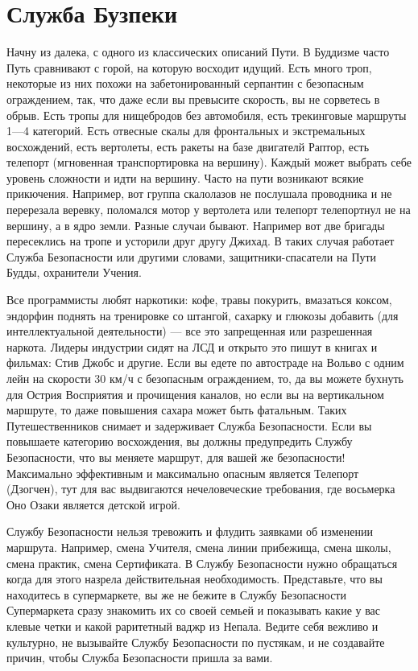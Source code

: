 \section{Служба Бузпеки}

Начну из далека, с одного из классических описаний Пути. В Буддизме часто Путь сравнивают с горой, на которую восходит идущий. Есть много троп, некоторые из них похожи на забетонированный серпантин с безопасным ограждением, так, что даже если вы превысите скорость, вы не сорветесь в обрыв. Есть тропы для нищебродов без автомобиля, есть трекинговые маршруты 1—4 категорий. Есть отвесные скалы для фронтальных и экстремальных восхождений, есть вертолеты, есть ракеты на базе двигателй Раптор, есть телепорт (мгновенная транспортировка на вершину). Каждый может выбрать себе уровень сложности и идти на вершину. Часто на пути возникают всякие прикючения. Например, вот группа скалолазов не послушала проводника и не перерезала веревку, поломался мотор у вертолета или телепорт телепортнул не на вершину, а в ядро земли. Разные случаи бывают. Например вот две бригады пересеклись на тропе и усторили друг другу Джихад. В таких случая работает Служба Безопасности или другими словами, защитники-спасатели на Пути Будды, охранители Учения.

Все программисты любят наркотики: кофе, травы покурить, вмазаться коксом, эндорфин поднять на тренировке со штангой, сахарку и глюкозы добавить (для интеллектуальной деятельности) — все это запрещенная или разрешенная наркота. Лидеры индустрии сидят на ЛСД и открыто это пишут в книгах и фильмах: Стив Джобс и другие. Если вы едете по автостраде на Вольво с одним лейн на скорости 30 км/ч с безопасным ограждением, то, да вы можете бухнуть для Острия Восприятия и прочищения каналов, но если вы на вертикальном маршруте, то даже повышения сахара может быть фатальным. Таких Путешественников снимает и задерживает Служба Безопасности. Если вы повышаете категорию восхождения, вы должны предупредить Службу Безопасности, что вы меняете маршрут, для вашей же безопасности! Максимально эффективным и максимально опасным является Телепорт (Дзогчен), тут для вас выдвигаются нечеловеческие требования, где восьмерка Оно Озаки является детской игрой.

Службу Безопасности нельзя тревожить и флудить заявками об изменении маршрута. Например, смена Учителя, смена линии прибежища, смена школы, смена практик, смена Сертификата. В Службу Безопасности нужно обращаться когда для этого назрела действительная необходимость. Представьте, что вы находитесь в супермаркете, вы же не бежите в Службу Безопасности Супермаркета сразу знакомить их со своей семьей и показывать какие у вас клевые четки и какой раритетный ваджр из Непала. Ведите себя вежливо и культурно, не вызывайте Службу Безопасности по пустякам, и не создавайте причин, чтобы Служба Безопасности пришла за вами.

